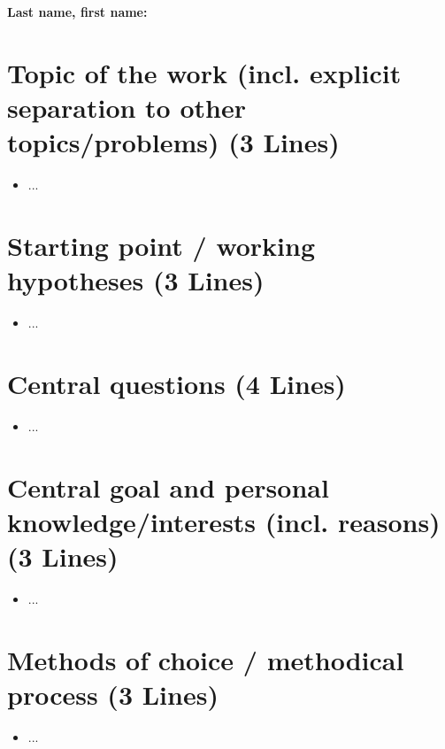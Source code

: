 

\textbf{Last name, first name:  }



\section*{Topic of the work (incl. explicit separation to other topics/problems) (3 Lines)}


\begin{itemize}
    \item ...
 
\end{itemize}


\section*{Starting point / working hypotheses (3 Lines)}

\begin{itemize}
    \item ...
 
\end{itemize}

\section*{Central questions (4 Lines)}

\begin{itemize}
    \item ...
 
\end{itemize}

\section*{Central goal and personal knowledge/interests (incl. reasons) (3 Lines)}

\begin{itemize}
    \item ...
 
\end{itemize}

\section*{Methods of choice / methodical process (3 Lines)}

\begin{itemize}
    \item ...
 
\end{itemize}


